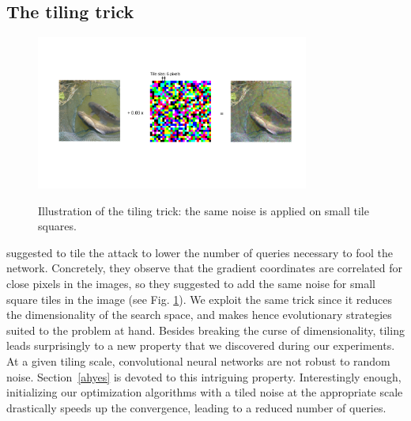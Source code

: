 \subsection{The tiling trick}
\begin{figure}
    \centering
    \includegraphics[width=0.8\textwidth]{sections/appendix/arxiv_dfo/images/tile_noise.pdf} \\
    \caption{Illustration of the tiling trick: the same noise is applied on small tile squares.}
    \label{rand}
\end{figure}
\cite{ilyas2018prior} suggested to tile the attack to lower the number of queries necessary to fool the network. Concretely, they observe that the gradient coordinates are correlated for close pixels in the images, so they suggested to add the same noise for small square tiles in the image (see Fig. \ref{rand}). We exploit the same trick since it reduces the dimensionality of the search space, and makes hence evolutionary strategies suited to the problem at hand. Besides breaking the curse of dimensionality, tiling leads surprisingly to a new property that we discovered during our experiments. At a given tiling scale, convolutional neural networks are not robust to random noise. Section~\ref{ahyes} is devoted to this intriguing property. Interestingly enough, initializing our optimization algorithms with a tiled noise at the appropriate scale drastically speeds up the convergence, leading to a reduced number of queries.


